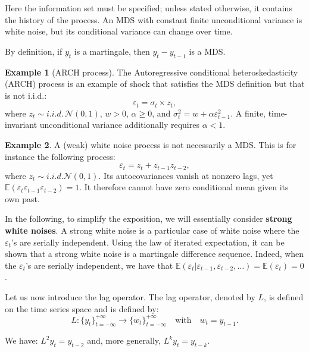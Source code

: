 \documentclass[
  11pt,
]{book}
\theoremstyle{definition}
\theoremstyle{definition}
\newtheorem{example}{Example}[chapter]
\theoremstyle{definition}
\theoremstyle{definition}
\theoremstyle{remark}
\begin{document}
Here the information set must be specified; unless stated otherwise, it contains the history of the process. An MDS with constant finite unconditional variance is white noise, but its conditional variance can change over time.

By definition, if \(y_t\) is a martingale, then \(y_{t}-y_{t-1}\) is a MDS.

\begin{example}[ARCH process]
\protect\hypertarget{exm:ARCH}{}\label{exm:ARCH}The Autoregressive conditional heteroskedasticity (ARCH) process is an example of shock that satisfies the MDS definition but that is not i.i.d.:
\[
\varepsilon_{t} = \sigma_t \times z_{t},
\]
where \(z_t \sim i.i.d.\,\mathcal{N}(0,1)\), \(w>0\), \(\alpha\ge0\), and \(\sigma_t^2 = w + \alpha \varepsilon_{t-1}^2\). A finite, time-invariant unconditional variance additionally requires \(\alpha<1\).
\end{example}

\begin{example}
\protect\hypertarget{exm:whiteNotMDS}{}\label{exm:whiteNotMDS}A (weak) white noise process is not necessarily a MDS. This is for instance the following process:
\[
\varepsilon_{t} = z_t + z_{t-1}z_{t-2},
\]
where \(z_t \sim i.i.d.\mathcal{N}(0,1)\). Its autocovariances vanish at nonzero lags, yet \(\mathbb{E}(\varepsilon_t\varepsilon_{t-1}\varepsilon_{t-2})=1\). It therefore cannot have zero conditional mean given its own past.
\end{example}

In the following, to simplify the exposition, we will essentially consider \textbf{strong white noises}. A strong white noise is a particular case of white noise where the \(\varepsilon_{t}\)'s are serially independent. Using the law of iterated expectation, it can be shown that a strong white noise is a martingale difference sequence. Indeed, when the \(\varepsilon_{t}\)'s are serially independent, we have that \(\mathbb{E}(\varepsilon_{t}|\varepsilon_{t-1},\varepsilon_{t-2},\dots)=\mathbb{E}(\varepsilon_{t})=0\).

Let us now introduce the lag operator. The lag operator, denoted by \(L\), is defined on the time series space and is defined by:
\begin{equation}
L: \{y_t\}_{t=-\infty}^{+\infty} \rightarrow \{w_t\}_{t=-\infty}^{+\infty} \quad \mbox{with} \quad w_t = y_{t-1}.\label{eq:lagOp}
\end{equation}

We have: \(L^2 y_t = y_{t-2}\) and, more generally, \(L^k y_t = y_{t-k}\).
\end{document}
